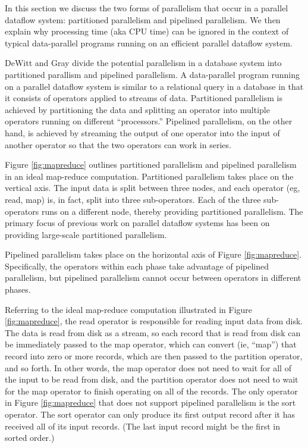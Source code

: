\documentclass{acm_proc_article-sp}
\begin{document}
In this section we discuss the two forms of parallelism that occur in a
parallel dataflow system: partitioned parallelism and pipelined parallelism. We
then explain why processing time (aka CPU time) can be ignored in the context
of typical data-parallel programs running on an efficient parallel dataflow
system.

DeWitt and Gray \cite{paralleldatabases} divide the potential parallelism in a
database system into partitioned parallism and pipelined parallelism. A
data-parallel program running on a parallel dataflow system is similar to a
relational query in a database in that it consists of operators applied to
streams of data. Partitioned parallelism is achieved by partitioning the data
and splitting an operator into multiple operators running on different
``processors.'' Pipelined parallelism, on the other hand, is achieved by
streaming the output of one operator into the input of another operator so that
the two operators can work in series.

Figure \ref{fig:mapreduce} outlines partitioned parallelism and pipelined
parallelism in an ideal map-reduce computation. Partitioned parallelism takes place on the
vertical axis. The input data is split between three nodes, and each operator
(eg, read, map) is, in fact, split into three sub-operators. Each of the three
sub-operators runs on a different node, thereby providing partitioned
parallelism. The primary focus of previous work on parallel dataflow systems
has been on providing large-scale partitioned parallelism.

Pipelined parallelism takes place on the horizontal axis of Figure
\ref{fig:mapreduce}. Specifically, the operators within each phase take
advantage of pipelined parallelism, but pipelined parallelism cannot occur
between operators in different phases.

Referring to the ideal map-reduce computation illustrated in Figure \ref{fig:mapreduce}, the read
operator is responsible for reading input data from disk. The data is read from
disk as a stream, so each record that is read from disk can be immediately
passed to the map operator, which can convert (ie, ``map'') that record into
zero or more records, which are then passed to the partition operator, and so
forth. In other words, the map operator does not need to wait for all of the
input to be read from disk, and the partition operator does not need to wait
for the map operator to finish operating on all of the records. The only
operator in Figure \ref{fig:mapreduce} that does not support pipelined
parallelism is the sort operator. The sort operator can only produce its first
output record after it has received all of its input records. (The last input
record might be the first in sorted order.)
\end{document}
